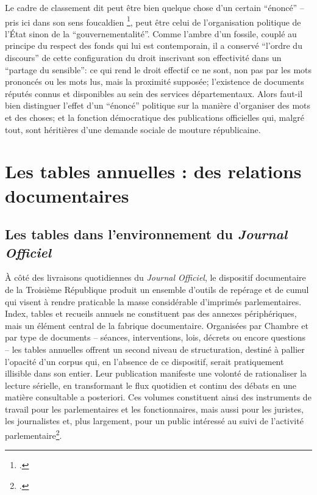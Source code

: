 Le cadre de classement dit peut être bien quelque chose d’un certain \enquote{énoncé} -- pris ici dans son sens foucaldien \footcite[][]{foucault}, peut être celui de l’organisation politique de l’État sinon de la \enquote{gouvernementalité}. Comme l’ambre d’un fossile, couplé au principe du respect des fonds qui lui est contemporain, il a conservé \enquote{l’ordre du discours} de cette configuration du droit inscrivant son effectivité dans un \enquote{partage du sensible}: ce qui rend le droit effectif ce ne sont, non pas par les mots prononcés ou les mots lus, mais la proximité supposée; l’existence de documents réputés connus et disponibles au sein des services départementaux. Alors faut-il bien distinguer l’effet d’un \enquote{énoncé} politique sur la manière d’organiser des mots et des choses; et la fonction démocratique des publications officielles qui, malgré tout, sont héritières d’une demande sociale de mouture républicaine.

\chapter[Les \textit{Tables annuelles}]{Les tables annuelles : des relations documentaires}

\section{Les tables dans l’environnement du \emph{Journal Officiel}}

À côté des livraisons quotidiennes du \emph{Journal Officiel}, le dispositif documentaire de la Troisième République produit un ensemble d’outils de repérage et de cumul qui visent à rendre praticable la masse considérable d’imprimés parlementaires. Index, tables et recueils annuels ne constituent pas des annexes périphériques, mais un élément central de la fabrique documentaire. Organisées par Chambre et par type de documents – séances, interventions, lois, décrets ou encore questions – les tables annuelles offrent un second niveau de structuration, destiné à pallier l’opacité d’un corpus qui, en l’absence de ce dispositif, serait pratiquement illisible dans son entier. Leur publication manifeste une volonté de rationaliser la lecture sérielle, en transformant le flux quotidien et continu des débats en une matière consultable a posteriori. Ces volumes constituent ainsi des instruments de travail pour les parlementaires et les fonctionnaires, mais aussi pour les juristes, les journalistes et, plus largement, pour un public intéressé au suivi de l’activité parlementaire\footcite[][]{poudra}.

